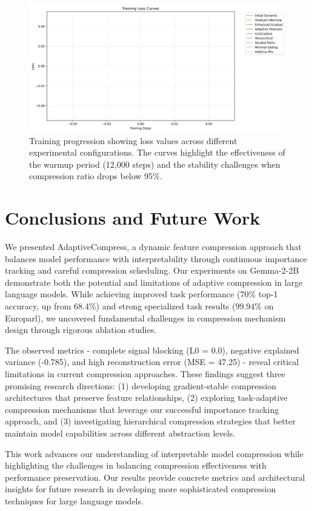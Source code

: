 \documentclass{article} %
\begin{document}
\begin{figure}[t]
    \centering
    \includegraphics[width=\textwidth]{training_curves.png}
    \caption{Training progression showing loss values across different experimental configurations. The curves highlight the effectiveness of the warmup period (12,000 steps) and the stability challenges when compression ratio drops below 95\%.}
    \label{fig:training_curves}
\end{figure}

\section{Conclusions and Future Work}
\label{sec:conclusion}

We presented AdaptiveCompress, a dynamic feature compression approach that balances model performance with interpretability through continuous importance tracking and careful compression scheduling. Our experiments on Gemma-2-2B demonstrate both the potential and limitations of adaptive compression in large language models. While achieving improved task performance (70\% top-1 accuracy, up from 68.4\%) and strong specialized task results (99.94\% on Europarl), we uncovered fundamental challenges in compression mechanism design through rigorous ablation studies.

The observed metrics - complete signal blocking (L0 = 0.0), negative explained variance (-0.785), and high reconstruction error (MSE = 47.25) - reveal critical limitations in current compression approaches. These findings suggest three promising research directions: (1) developing gradient-stable compression architectures that preserve feature relationships, (2) exploring task-adaptive compression mechanisms that leverage our successful importance tracking approach, and (3) investigating hierarchical compression strategies that better maintain model capabilities across different abstraction levels.

This work advances our understanding of interpretable model compression while highlighting the challenges in balancing compression effectiveness with performance preservation. Our results provide concrete metrics and architectural insights for future research in developing more sophisticated compression techniques for large language models.



\end{document}
